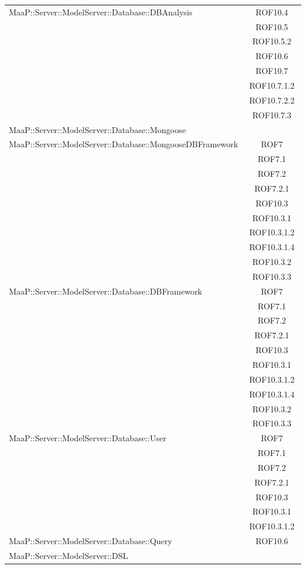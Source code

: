 \begin{center}
\begin{longtable}{|p{0.8\linewidth}|c|}
\midrule
MaaP::Server::ModelServer::Database::DBAnalysis
& ROF10.4\\
& ROF10.5\\
& ROF10.5.2\\
& ROF10.6\\
& ROF10.7\\
& ROF10.7.1.2\\
& ROF10.7.2.2\\
& ROF10.7.3\\

\midrule
MaaP::Server::ModelServer::Database::Mongoose
& \\

\midrule
MaaP::Server::ModelServer::Database::MongooseDBFramework
& ROF7\\
& ROF7.1\\
& ROF7.2\\
& ROF7.2.1\\
& ROF10.3\\
& ROF10.3.1\\
& ROF10.3.1.2\\
& ROF10.3.1.4\\
& ROF10.3.2\\
& ROF10.3.3\\


\midrule
MaaP::Server::ModelServer::Database::DBFramework
& ROF7\\
& ROF7.1\\
& ROF7.2\\
& ROF7.2.1\\
& ROF10.3\\
& ROF10.3.1\\
& ROF10.3.1.2\\
& ROF10.3.1.4\\
& ROF10.3.2\\
& ROF10.3.3\\


\midrule
MaaP::Server::ModelServer::Database::User
& ROF7\\
& ROF7.1\\
& ROF7.2\\
& ROF7.2.1\\
& ROF10.3\\
& ROF10.3.1\\
& ROF10.3.1.2\\

\midrule
MaaP::Server::ModelServer::Database::Query
& ROF10.6\\

\midrule
MaaP::Server::ModelServer::DSL
& \\


\end{longtable}
\end{center}
